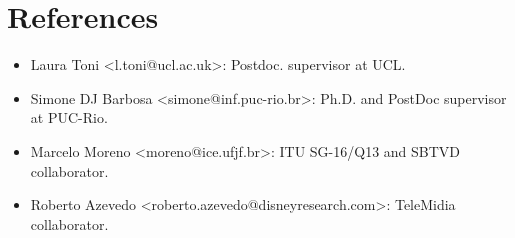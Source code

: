 \documentclass[10pt,a4paper,sans,colorlinks]{moderncv}
\begin{document}
\section{References}

\begin{itemize}[nosep]
  \item Laura Toni <l.toni@ucl.ac.uk>: Postdoc. supervisor at UCL.
  \item Simone DJ Barbosa <simone@inf.puc-rio.br>: Ph.D. and PostDoc supervisor at PUC-Rio.
  \item Marcelo Moreno <moreno@ice.ufjf.br>: ITU SG-16/Q13 and SBTVD collaborator.
  \item Roberto Azevedo <roberto.azevedo@disneyresearch.com>: TeleMidia collaborator.
\end{itemize}
\end{document}
